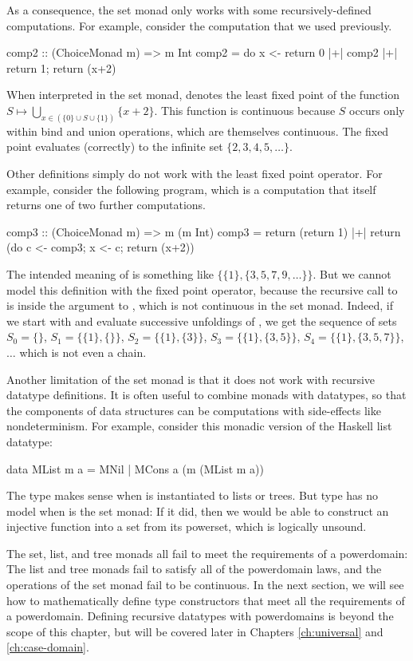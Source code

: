 As a consequence, the set monad only works with some recursively-defined computations. For example, consider the computation  that we used previously.
\begin{hscode}
comp2 :: (ChoiceMonad m) => m Int
comp2 = do {x <- return 0 |+| comp2 |+| return 1; return (x+2)}
\end{hscode}
When interpreted in the set monad,  denotes the least fixed point of the function $S \mapsto \bigcup_{x \in \left(\{0\} \cup S \cup \{1\}\right)}\{x+2\}$. This function is continuous because $S$ occurs only within bind and union operations, which are themselves continuous. The fixed point evaluates (correctly) to the infinite set $\{2,3,4,5,\dots\}$.

Other definitions simply do not work with the least fixed point operator. For example, consider the following program, which is a computation that itself returns one of two further computations.
\begin{hscode}
comp3 :: (ChoiceMonad m) => m (m Int)
comp3 = return (return 1) |+|
        return (do {c <- comp3; x <- c; return (x+2)})
\end{hscode}
The intended meaning of  is something like $\{\{1\},\{3,5,7,9,\dots\}\}$. But we cannot model this definition with the fixed point operator, because the recursive call to  is inside the argument to , which is not continuous in the set monad. Indeed, if we start with  and evaluate successive unfoldings of , we get the sequence of sets $S_0 = \{\}$, $S_1 = \{\{1\},\{\}\}$, $S_2 = \{\{1\},\{3\}\}$, $S_3 = \{\{1\},\{3,5\}\}$, $S_4 = \{\{1\},\{3,5,7\}\}$, $\dots$ which is not even a chain.

Another limitation of the set monad is that it does not work with recursive datatype definitions. It is often useful to combine monads with datatypes, so that the components of data structures can be computations with side-effects like nondeterminism. For example, consider this monadic version of the Haskell list datatype:
\begin{hscode}
data MList m a = MNil | MCons a (m (MList m a))
\end{hscode}
The  type makes sense when  is instantiated to lists or trees. But type  has no model when  is the set monad: If it did, then we would be able to construct an injective function into a set from its powerset, which is logically unsound.

The set, list, and tree monads all fail to meet the requirements of a powerdomain: The list and tree monads fail to satisfy all of the powerdomain laws, and the operations of the set monad fail to be continuous. In the next section, we will see how to mathematically define type constructors that meet all the requirements of a powerdomain. Defining recursive datatypes with powerdomains is beyond the scope of this chapter, but will be covered later in Chapters \ref{ch:universal} and \ref{ch:case-domain}.

